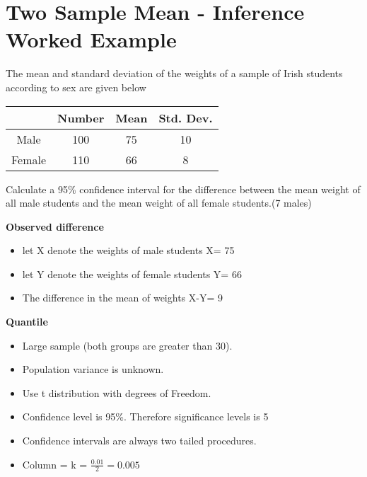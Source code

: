﻿\documentclass[]{report}
\begin{document}
\section{Two Sample Mean - Inference Worked Example}
The mean and standard deviation of the weights of a sample of Irish students according to sex are given below

\begin{center}
\begin{tabular}{|c|c|c|c|}\hline
& Number & Mean & Std. Dev. \\ \hline
Male &100&75&10 \\ \hline
Female&110& 66&8 \\  \hline

\end{tabular}
\end{center}


Calculate a 95\% confidence interval for the difference between the mean weight of all male
students and the mean weight of all female students.(7 males)




\noindent \textbf{Observed difference}

\begin{itemize}
\item let X denote the weights of male students    X= 75
\item let Y denote the weights of female students  Y= 66
\item The difference in the mean of weights X-Y= 9
\end{itemize}
\noindent \textbf{Quantile}

\begin{itemize}
\item Large sample (both groups are greater than 30).
\item Population variance is unknown.
\item Use t distribution with  degrees of Freedom.
\item Confidence level is 95\%. Therefore significance levels is 5%
\item Confidence intervals are always two tailed procedures.
\item Column = k = $\frac{0.01}{2}= 0.005$
\end{itemize}
\end{document}
